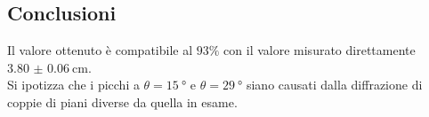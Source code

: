 \documentclass[a4paper]{article}
\begin{document}
\subsection{Conclusioni}
Il valore ottenuto è compatibile al $93\%$ con il valore misurato direttamente $\SI{3.80(6)}{\cm}$.\\
Si ipotizza che i picchi a $\theta=\SI{15}{\degree}$ e $\theta=\SI{29}{\degree}$ siano causati dalla diffrazione di coppie di piani diverse da quella in esame.
\end{document}
